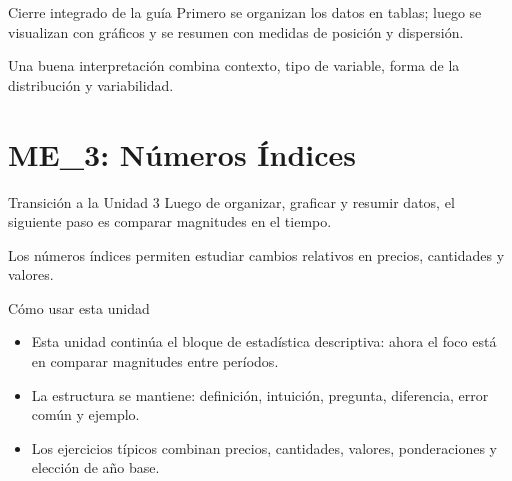 \documentclass[aspectratio=169,11pt]{beamer}
\begin{document}
\begin{frame}{Cierre integrado de la guía}
\centering
\Large
Primero se organizan los datos en tablas; luego se visualizan con gráficos y se resumen con medidas de posición y dispersión.
\vspace{0.8em}

\normalsize
Una buena interpretación combina contexto, tipo de variable, forma de la distribución y variabilidad.
\end{frame}


\part{ME\_3: Números Índices}

\begin{frame}{Transición a la Unidad 3}
\centering
\Large
Luego de organizar, graficar y resumir datos, el siguiente paso es comparar magnitudes en el tiempo.
\vspace{0.8em}

\normalsize
Los números índices permiten estudiar cambios relativos en precios, cantidades y valores.
\end{frame}

\begin{frame}{Cómo usar esta unidad}
\begin{itemize}
  \item Esta unidad continúa el bloque de estadística descriptiva: ahora el foco está en comparar magnitudes entre períodos.
  \item La estructura se mantiene: definición, intuición, pregunta, diferencia, error común y ejemplo.
  \item Los ejercicios típicos combinan precios, cantidades, valores, ponderaciones y elección de año base.
\end{itemize}
\end{frame}
\end{document}
